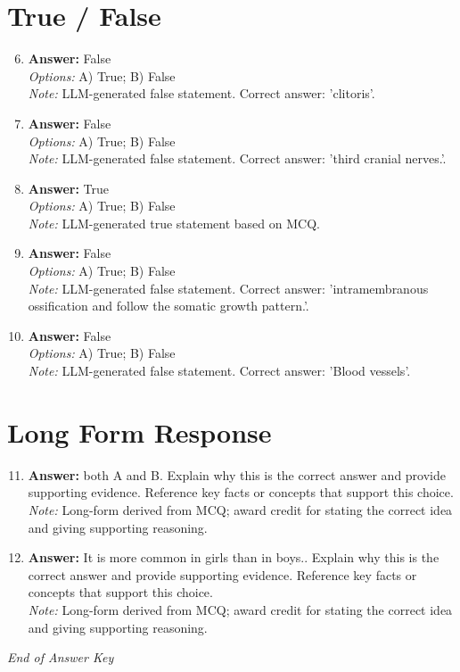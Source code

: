 \documentclass[12pt]{article}
\begin{document}
\section*{True / False}
\begin{enumerate}[label=\arabic*.]
\setcounter{enumi}{5}
\item \textbf{Answer:} False
\\ \textit{Options:} A) True; B) False
\\ \textit{Note:} LLM-generated false statement. Correct answer: 'clitoris'.
\item \textbf{Answer:} False
\\ \textit{Options:} A) True; B) False
\\ \textit{Note:} LLM-generated false statement. Correct answer: 'third cranial nerves.'.
\item \textbf{Answer:} True
\\ \textit{Options:} A) True; B) False
\\ \textit{Note:} LLM-generated true statement based on MCQ.
\item \textbf{Answer:} False
\\ \textit{Options:} A) True; B) False
\\ \textit{Note:} LLM-generated false statement. Correct answer: 'intramembranous ossification and follow the somatic growth pattern.'.
\item \textbf{Answer:} False
\\ \textit{Options:} A) True; B) False
\\ \textit{Note:} LLM-generated false statement. Correct answer: 'Blood vessels'.
\end{enumerate}

\section*{Long Form Response}
\begin{enumerate}[label=\arabic*.]
\setcounter{enumi}{10}
\item \textbf{Answer:} both A and B. Explain why this is the correct answer and provide supporting evidence. Reference key facts or concepts that support this choice.
\\ \textit{Note:} Long-form derived from MCQ; award credit for stating the correct idea and giving supporting reasoning.
\item \textbf{Answer:} It is more common in girls than in boys.. Explain why this is the correct answer and provide supporting evidence. Reference key facts or concepts that support this choice.
\\ \textit{Note:} Long-form derived from MCQ; award credit for stating the correct idea and giving supporting reasoning.
\end{enumerate}

\vfill
\noindent\textit{End of Answer Key}
\end{document}
